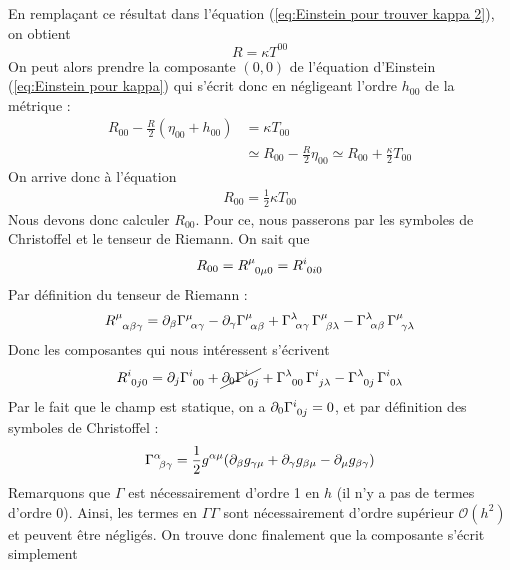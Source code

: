 En remplaçant ce résultat dans l'équation (\ref{eq:Einstein pour trouver kappa 2}), on obtient
\begin{equation}
    R = \kappa T^{00}
\end{equation}
On peut alors prendre la composante $(0,0)$ de l'équation d'Einstein (\ref{eq:Einstein pour kappa}) qui s'écrit donc en négligeant l'ordre $h_{00}$ de la métrique :
\begin{align}
    R_{00} - \frac{R}{2}(\eta_{00} + h_{00}) &= \kappa T_{00}\\
     &\simeq R_{00} - \frac{R}{2} \eta_{00} \simeq R_{00} + \frac{\kappa}{2} T_{00}
\end{align}
On arrive donc à l'équation
\begin{align}
\label{eq: kappa intermediar}
    \boxed{R_{00} = \frac{1}{2}\kappa T_{00}}
\end{align}
Nous devons donc calculer $R_{00}$. Pour ce, nous passerons par les symboles de Christoffel et le tenseur de Riemann. On sait que
\begin{equation}
    R_{00} = R\indices{^{\mu}_{0\mu 0}} = R\indices{^{i}_{0 i 0}}
\end{equation}
Par définition du tenseur de Riemann :
\begin{equation}
    R\indices{^{\mu}_{\alpha \beta \gamma}} = \partial_{\beta}\Gamma\indices{^{\mu}_{\!\alpha \gamma}} - \partial_{\gamma} \Gamma\indices{^{\mu}_{\!\alpha \beta}} + \Gamma\indices{^{\lambda}_{\!\alpha \gamma}}\,\Gamma\indices{^{\mu}_{\!\beta \lambda}} - \Gamma\indices{^{\lambda}_{\!\alpha \beta}}\,\Gamma\indices{^{\mu}_{\!\gamma \lambda}}
\end{equation}
Donc les composantes qui nous intéressent s'écrivent
\begin{equation}
    R\indices{^{i}_{0 j 0}} = \partial_{j}\Gamma\indices{^{i}_{00}} + \cancel{\partial_{0} \Gamma\indices{^{i}_{0 j}}} + \Gamma\indices{^{\lambda}_{00}}\,\Gamma\indices{^{i}_{j \lambda}} - \Gamma\indices{^{\lambda}_{0 j}}\,\Gamma\indices{^{i}_{0 \lambda}}
    \label{eq:Tenseur de Riemman pour kappa}
\end{equation}
Par le fait que le champ est statique, on a $\partial_{0} \Gamma\indices{^{i}_{0 j}} = 0$, et par définition des symboles de Christoffel :
\begin{align}
    \Gamma\indices{^{\alpha}_{\!\beta \gamma}} = \frac{1}{2}g^{\alpha \mu}(\partial_{\beta}g_{\gamma \mu} +\partial_{\gamma}g_{\beta \mu} - \partial_{\mu}g_{\beta \gamma})
\end{align}
Remarquons que $\Gamma$ est nécessairement d'ordre 1 en $h$ (il n'y a pas de termes d'ordre $0$). Ainsi, les termes en $\Gamma \Gamma$ sont nécessairement d'ordre supérieur $\mathcal{O}(h^2)$ et peuvent être négligés. On trouve donc finalement que la composante s'écrit simplement
